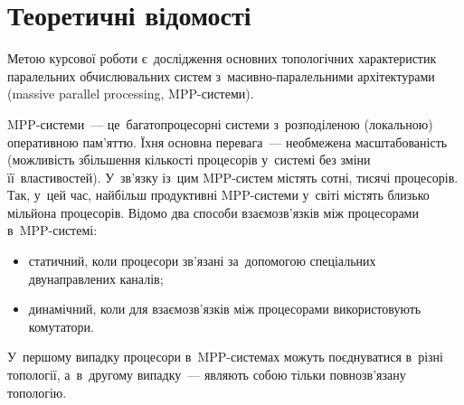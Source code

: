 \documentclass[
	a4paper,
	oneside,
	BCOR = 10mm,
	DIV = 12,
	12pt,
	headings = normal,
]{scrartcl}
\begin{document}
	\section{Теоретичні відомості}
		Метою курсової роботи є~дослідження основних топологічних характеристик паралельних обчислювальних систем з~масивно-паралельними архітектурами (\textenglish{massive parallel processing}, \textenglish{MPP}-системи).

		\textenglish{MPP}-системи~— це~багатопроцесорні системи з~розподіленою (локальною) оперативною пам'яттю. Їхня основна перевага~— необмежена масштабованість (можливість збільшення кількості процесорів у~системі без зміни її~властивостей). У~зв'язку із~цим \textenglish{MPP}-систем містять сотні, тисячі процесорів. Так, у~цей час, найбільш продуктивні \textenglish{MPP}-системи у~світі містять близько мільйона процесорів. Відомо два способи взаємозв'язків між процесорами в~\textenglish{MPP}-системі:
		\begin{itemize}
			\item статичний, коли процесори зв'язані за~допомогою спеціальних двунаправлених каналів;
			\item динамічний, коли для взаємозв'язків між процесорами використовують комутатори.
		\end{itemize}
		У~першому випадку процесори в~\textenglish{MPP}-системах можуть поєднуватися в~різні топології, а~в~другому випадку~— являють собою тільки повнозв’язану топологію.
\end{document}
